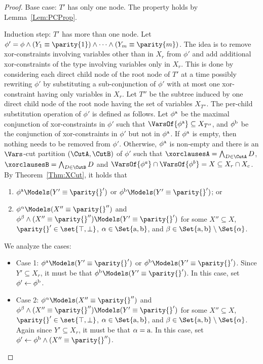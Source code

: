 \begin{proof}
Base case: $T'$ has only one node. The property holds by Lemma~\ref{Lem:PCProp}.


Induction step: $T'$ has more than one node.
Let $\phi' = \phi \wedge (Y_1 \equiv \parity{1}) \wedge \dots \wedge (Y_m \equiv \parity{m}) $. 
The idea is to remove xor-constraints involving variables other than in
$X_r$ from $\phi'$ and add additional xor-constraints of the type involving variables only in $X_r$.
This is done by considering each direct child node of the root node of $T'$ at
a time possibly rewriting $\phi'$ by substituting a sub-conjunction of $\phi'$ with at most one xor-constraint having only variables in $X_r$.
Let $T''$ be the subtree induced by one direct child node of the root node
having the set of variables $X_{T''}$. The per-child substitution operation of $\phi'$ is defined as follows.
\newcommand{\phiA}{\phi^{\textup{a}}}
\newcommand{\phiB}{\phi^{\textup{b}}}
Let $\phiA $ be the maximal conjunction of xor-constraints in $\phi'$ such that
$\VarsOf{\phiA} \subseteq X_{T''}$, and $\phiB$ be the conjunction of
xor-constraints in $\phi'$ but not in $\phiA$.
If $\phiA$ is empty, then nothing needs to be removed from $\phi'$.
Otherwise, $\phiA$ is non-empty and there is an $\Vars$-cut partition
$(\CutA, \CutB)$ of $\phi'$ such that $ \xorclausesA = \bigwedge_{D \in \CutA} D$, $\xorclausesB = \bigwedge_{D \in \CutB} D$ and $\VarsOf{\phi^a} \cap \VarsOf{\phi^b} = X \subseteq X_r \cap X_c $.
By Theorem~\ref{Thm:XCut}, it holds that
\begin{enumerate}
\item $\phiA \Models (Y' \equiv \parity{}') $
or $ \phiB \Models (Y' \equiv \parity{}') $;
or
\item $\phi^\alpha \Models 
( X'' \equiv \parity{}'') $ and $ \phi^\beta \wedge (X'' \equiv \parity{}'') \Models (Y' \equiv \parity{}') $ for some $X'' \subseteq X$,
$\parity{}' \in \set{\top,\bot}$, $\alpha \in \Set{\textup{a},\textup{b}}$, and $\beta \in \Set{\textup{a},\textup{b}}\setminus\Set{\alpha}$.
\end{enumerate}

We analyze the cases:
\begin{itemize}
\item[] Case 1: $\phiA \Models (Y' \equiv \parity{}') $
or $ \phiB \Models (Y' \equiv \parity{}') $. Since $Y' \subseteq X_r$, it must be that $\phiB \Models (Y' \equiv \parity{}') $. In this case, set $\phi' \leftarrow \phiB $.
\item[] Case 2: $\phi^\alpha \Models 
( X'' \equiv \parity{}'') $ and $ \phi^\beta \wedge (X'' \equiv \parity{}'') \Models (Y' \equiv \parity{}') $ for some $X'' \subseteq X$,
$\parity{}' \in \set{\top,\bot}$, $\alpha \in \Set{\textup{a},\textup{b}}$, and $\beta \in \Set{\textup{a},\textup{b}}\setminus\Set{\alpha}$. Again since $Y' \subseteq X_r$, it must be that $\alpha = \textup{a}$. In this case, set $ \phi' \leftarrow \phiB \wedge (X'' \equiv \parity{}'') $.
\end{itemize} 


\end{proof}
